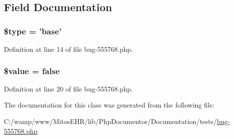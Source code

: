 \subsection{\-Field \-Documentation}
\hypertarget{classiiparser_base_a9a4a6fba2208984cabb3afacadf33919}{
\subsubsection[{\$type}]{\setlength{\rightskip}{0pt plus 5cm}\$type = 'base'}}\label{classiiparser_base_a9a4a6fba2208984cabb3afacadf33919}


\-Definition at line 14 of file bug-\/555768.\-php.

\hypertarget{classiiparser_base_a0f298096f322952a72a50f98a74c7b60}{
\subsubsection[{\$value}]{\setlength{\rightskip}{0pt plus 5cm}\$value = false}}\label{classiiparser_base_a0f298096f322952a72a50f98a74c7b60}


\-Definition at line 20 of file bug-\/555768.\-php.



\-The documentation for this class was generated from the following file\-:\begin{DoxyCompactItemize}
\item 
\-C\-:/wamp/www/\-Mitos\-E\-H\-R/lib/\-Php\-Documentor/\-Documentation/tests/\hyperlink{bug-555768_8php}{bug-\/555768.\-php}\end{DoxyCompactItemize}
